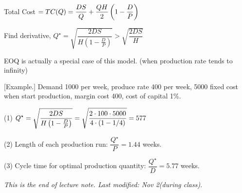 \documentclass[11pt, a4paper]{ISOM2700}
\begin{document}
\begin{spacing}{1.5}
    Total Cost $\displaystyle = TC(Q)=\frac{DS}{Q}+\frac{QH}{2}\left(1-\frac{D}{P}\right)$

    Find derivative, $Q^\star=\sqrt{\dfrac{2DS}{H\left(1-\frac{D}{P}\right)}}>\sqrt{\dfrac{2DS}{H}}$

    EOQ is actually a special case of this model. (when production rate tends to infinity)

    [Example.] Demand 1000 per week, produce rate 400 per week, 5000 fixed cost when start 
    production, margin cost 400, cost of capital 1\%.

    (1) $\displaystyle Q^\star=\sqrt{\dfrac{2DS}{H\left(1-\frac{D}{P}\right)}}=
    \sqrt{\dfrac{2\cdot 100\cdot 5000}{4\cdot (1-1/4)}}=577$

    (2) Length of each production run: $\dfrac{Q^\star}{P}=1.44$ weeks.

    (3) Cycle time for optimal production quantity: $\dfrac{Q^\star}{D}=5.77$ weeks.

    \vspace{1in}
    {\it This is the end of lecture note. Last modified: Nov 2(during class).}

\end{spacing}
\end{document}
